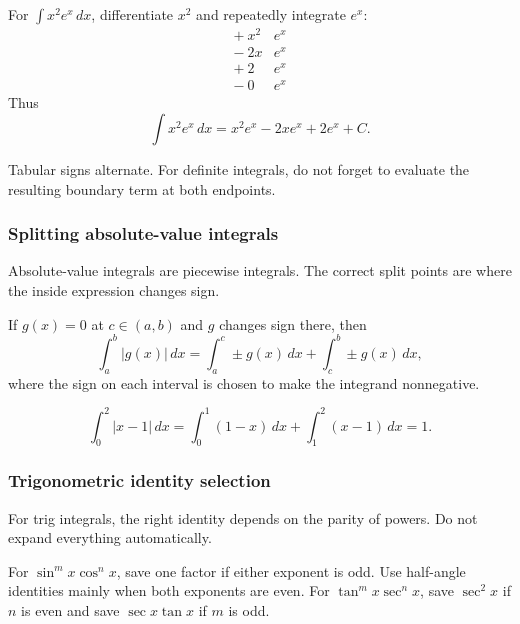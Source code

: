 \begin{examplebox}[title={Tabular Integration by Parts}]
For \(\int x^2e^x\,dx\), differentiate \(x^2\) and repeatedly integrate \(e^x\):
\[
\begin{array}{c|c}
+\ x^2 & e^x\\
-\ 2x & e^x\\
+\ 2 & e^x\\
-\ 0 & e^x
\end{array}
\]
Thus
\[
\int x^2e^x\,dx=x^2e^x-2xe^x+2e^x+C.
\]
\end{examplebox}

\begin{commonmistake}
Tabular signs alternate.  For definite integrals, do not forget to evaluate the
resulting boundary term at both endpoints.
\end{commonmistake}

\newpage
\subsubsection{Splitting absolute-value integrals}
\begin{extension}
Absolute-value integrals are piecewise integrals.  The correct split points are
where the inside expression changes sign.
\end{extension}

\begin{keyformula}[title={Absolute-Value Split}]
If \(g(x)=0\) at \(c\in(a,b)\) and \(g\) changes sign there, then
\[
\int_a^b |g(x)|\,dx
=\int_a^c \pm g(x)\,dx+\int_c^b \pm g(x)\,dx,
\]
where the sign on each interval is chosen to make the integrand nonnegative.
\end{keyformula}

\begin{examplebox}[title={Simple Split}]
\[
\int_0^2 |x-1|\,dx
=\int_0^1(1-x)\,dx+\int_1^2(x-1)\,dx=1.
\]
\end{examplebox}

\newpage
\subsubsection{Trigonometric identity selection}
\begin{extension}
For trig integrals, the right identity depends on the parity of powers.  Do not
expand everything automatically.
\end{extension}

\begin{examtip}
For \(\sin^m x\cos^n x\), save one factor if either exponent is odd.  Use
half-angle identities mainly when both exponents are even.  For \(\tan^m x\sec^n x\),
save \(\sec^2x\) if \(n\) is even and save \(\sec x\tan x\) if \(m\) is odd.
\end{examtip}


